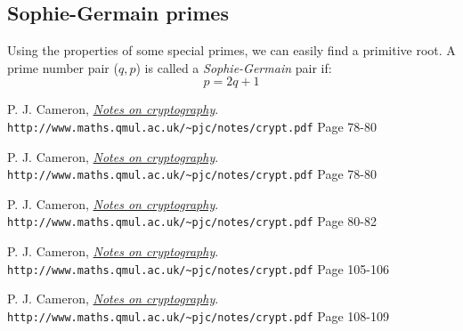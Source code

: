 \documentclass[12pt]{article}
\begin{document}
	
	\subsection*{Sophie-Germain primes \cite{sophie-germain}}
	Using the properties of some special primes, we can easily find a primitive root. A prime number pair ($q,p$) is called a \textit{Sophie-Germain} pair if:
	$$
	p = 2q + 1
	$$
		
	
	\newpage
	\begin{thebibliography}{99}
		
		P. J. Cameron, 
		\textit{\underline{Notes on cryptography}}.
		\\\texttt{http://www.maths.qmul.ac.uk/\textasciitilde{}pjc/notes/crypt.pdf}
		Page 78-80  
		
		P. J. Cameron, 
		\textit{\underline{Notes on cryptography}}.
		\\\texttt{http://www.maths.qmul.ac.uk/\textasciitilde{}pjc/notes/crypt.pdf}
		Page 78-80  
		
		P. J. Cameron, 
		\textit{\underline{Notes on cryptography}}.
		\\\texttt{http://www.maths.qmul.ac.uk/\textasciitilde{}pjc/notes/crypt.pdf}
		Page 80-82
		
		P. J. Cameron, 
		\textit{\underline{Notes on cryptography}}.
		\\\texttt{http://www.maths.qmul.ac.uk/\textasciitilde{}pjc/notes/crypt.pdf}
		Page 105-106
		
		P. J. Cameron, 
		\textit{\underline{Notes on cryptography}}.
		\\\texttt{http://www.maths.qmul.ac.uk/\textasciitilde{}pjc/notes/crypt.pdf}
		Page 108-109
		
	\end{thebibliography}
\end{document}
